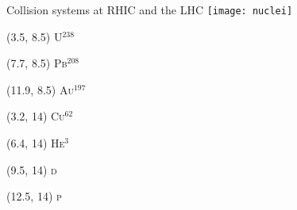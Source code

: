 \documentclass{beamer}
\begin{document}
\begin{frame}{Collision systems at RHIC and the LHC}
  \centering
  \texttt{[image: nuclei]}

  \begin{textblock}{1}(3.5, 8.5)
    \centering\scshape U$^{238}$
  \end{textblock}

  \begin{textblock}{1}(7.7, 8.5)
    \centering\scshape Pb$^{208}$
  \end{textblock}
  
  \begin{textblock}{1}(11.9, 8.5)
    \centering\scshape Au$^{197}$
  \end{textblock}

  \begin{textblock}{1}(3.2, 14)
    \centering\scshape Cu$^{62}$
  \end{textblock}

  \begin{textblock}{1}(6.4, 14)
    \centering\scshape He$^{3}$
  \end{textblock}

  \begin{textblock}{1}(9.5, 14)
    \centering\scshape d
  \end{textblock}

  \begin{textblock}{1}(12.5, 14)
    \centering\scshape p
  \end{textblock}

\end{frame}
\end{document}

